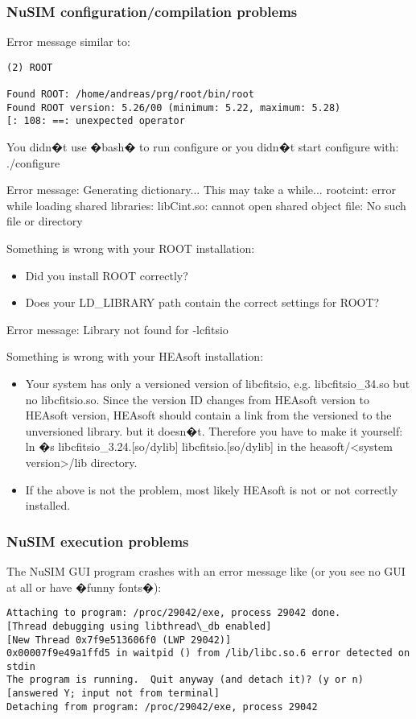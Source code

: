 \subsubsection{NuSIM configuration/compilation problems}

Error message similar to:
\begin{verbatim}
(2) ROOT

Found ROOT: /home/andreas/prg/root/bin/root
Found ROOT version: 5.26/00 (minimum: 5.22, maximum: 5.28)
[: 108: ==: unexpected operator
\end{verbatim}
You didn�t use �bash� to run configure or you didn�t start configure with: ./configure


Error message:
Generating dictionary... This may take a while...
rootcint: error while loading shared libraries: libCint.so: cannot open
shared object file: No such file or directory

Something is wrong with your ROOT installation:
\begin{itemize}
\item Did you install ROOT correctly?
\item	Does your LD\_LIBRARY path contain the correct settings for ROOT?
\end{itemize}
Error message:
Library not found for -lcfitsio

Something is wrong with your HEAsoft installation:
\begin{itemize}
\item	Your system has only a versioned version of libcfitsio, e.g. libcfitsio\_34.so but no libcfitsio.so. Since the version ID changes from HEAsoft version to HEAsoft version, HEAsoft should contain a link from the versioned to the unversioned library. but it doesn�t. Therefore you have to make it yourself:
ln �s libcfitsio\_3.24.[so/dylib] libcfitsio.[so/dylib]
in the heasoft/<system version>/lib directory.
\item	If the above is not the problem, most likely HEAsoft is not or not correctly installed.
\end{itemize}

\subsubsection{NuSIM execution problems}

The NuSIM GUI program crashes with an error message like (or you see no GUI at all or have �funny fonts�):
{\scriptsize \begin{verbatim}
Attaching to program: /proc/29042/exe, process 29042 done.
[Thread debugging using libthread\_db enabled]
[New Thread 0x7f9e513606f0 (LWP 29042)]
0x00007f9e49a1ffd5 in waitpid () from /lib/libc.so.6 error detected on stdin
The program is running.  Quit anyway (and detach it)? (y or n) [answered Y; input not from terminal]
Detaching from program: /proc/29042/exe, process 29042
\end{verbatim}}


